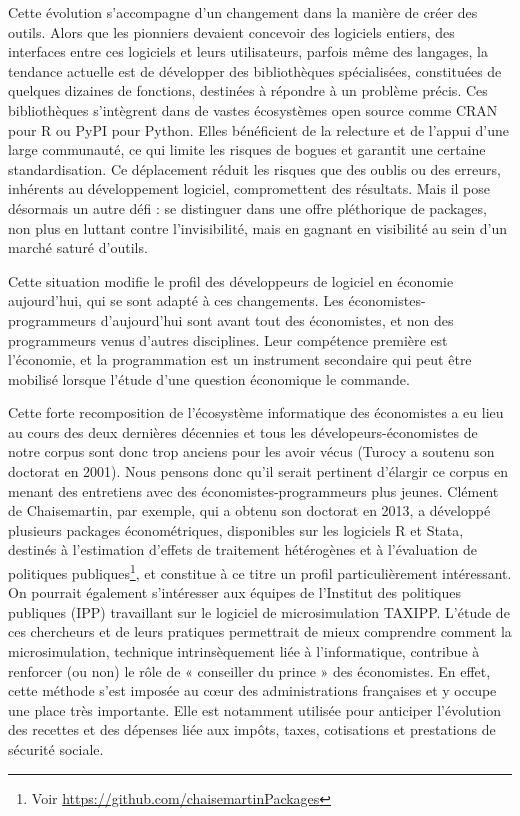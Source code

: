 Cette évolution s’accompagne d’un changement dans la manière de créer des outils. Alors que les pionniers devaient concevoir des logiciels entiers, des interfaces entre ces logiciels et leurs utilisateurs, parfois même des langages, la tendance actuelle est de développer des bibliothèques spécialisées, constituées de quelques dizaines de fonctions, destinées à répondre à un problème précis. Ces bibliothèques s’intègrent dans de vastes écosystèmes open source comme CRAN pour R ou PyPI pour Python. Elles bénéficient de la relecture et de l’appui d’une large communauté, ce qui limite les risques de bogues et garantit une certaine standardisation. Ce déplacement réduit les risques que des oublis ou des erreurs, inhérents au développement logiciel, compromettent des résultats. Mais il pose désormais un autre défi : se distinguer dans une offre pléthorique de packages, non plus en luttant contre l’invisibilité, mais en gagnant en visibilité au sein d’un marché saturé d’outils.

Cette situation modifie le profil des développeurs de logiciel en économie aujourd'hui, qui se sont adapté à ces changements. Les économistes-programmeurs d’aujourd’hui sont avant tout des économistes, et non des programmeurs venus d'autres disciplines. Leur compétence première est l'économie, et la programmation est un instrument secondaire qui peut être mobilisé lorsque l'étude d'une question économique le commande.


Cette forte recomposition de l'écosystème informatique des économistes a eu lieu au cours des deux dernières décennies et tous les dévelopeurs-économistes de notre corpus sont donc trop anciens pour les avoir vécus (Turocy a soutenu son doctorat en 2001). Nous pensons donc qu'il serait pertinent d’élargir ce corpus en menant des entretiens avec des économistes-programmeurs plus jeunes. Clément de Chaisemartin, par exemple, qui a obtenu son doctorat en 2013, a développé plusieurs packages économétriques, disponibles sur les logiciels R et Stata, destinés à l’estimation d’effets de traitement hétérogènes et à l’évaluation de politiques publiques\footnote{Voir \url{https://github.com/chaisemartinPackages}}, et constitue à ce titre un profil particulièrement intéressant.
On pourrait également s’intéresser aux équipes de l’Institut des politiques publiques (IPP) travaillant sur le logiciel de microsimulation TAXIPP. L’étude de ces chercheurs et de leurs pratiques permettrait de mieux comprendre comment la microsimulation, technique intrinsèquement liée à l’informatique, contribue à renforcer (ou non) le rôle de « conseiller du prince » des économistes. En effet, cette méthode s’est imposée au cœur des administrations françaises et y occupe une place très importante. Elle est notamment utilisée pour anticiper l’évolution des recettes et des dépenses liée aux impôts, taxes, cotisations et prestations de sécurité sociale.










